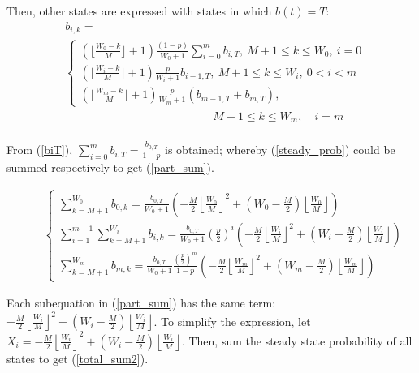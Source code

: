 \documentclass[journal]{IEEEtran}
\begin{document}
Then, other states are expressed with states in which $b(t)=T$:
\begin{align}
&b_{i,k} =  \nonumber \\
&
\begin{cases}
(\lfloor \frac{W_0-k}{M} \rfloor+1)\frac{(1-p)}{W_0+1}\sum_{i=0}^m b_{i,T}, \  M+1\leq k\leq W_0,\ i = 0\\[3pt]
(\lfloor \frac{W_i-k}{M} \rfloor+1)\frac{p}{W_i+1}b_{i-1,T}, 				\	 M+1 \leq k\leq W_i, \ 0<i<m \\[3pt]
(\lfloor \frac{W_m-k}{M} \rfloor+1)\frac{p}{W_m+1} (b_{m-1,T}+b_{m,T}), 	
\end{cases}\nonumber
\\ &\qquad \qquad \qquad \qquad \quad \qquad \qquad M+1 \leq k\leq W_m, \quad i = m \nonumber \\
\label{steady_prob}
\end{align}

From (\ref{biT}), $\sum_{i=0}^m b_{i,T}= \frac{b_{0,T}}{1-p}$ is obtained; whereby (\ref{steady_prob}) could be summed respectively to get (\ref{part_sum}).  

\begin{figure}[!t]
\begin{align}
\begin{cases}
\sum_{k=M+1}^{W_0} b_{0,k} = \frac{b_{0,T}}{W_0+1}\left(-\frac{M}{2}\left\lfloor \frac{W_0}{M}\right\rfloor ^2 + \left(W_0-\frac{M}{2}\right)\left\lfloor \frac{W_0}{M} \right\rfloor \right) \\[8pt]
\sum_{i=1}^{m-1}\sum_{k=M+1}^{W_i} b_{i,k} = \frac{b_{0,T}}{W_0+1}\left(\frac{p}{2}\right)^i \left(-\frac{M}{2}\left\lfloor \frac{W_i}{M}\right\rfloor ^2 + \left(W_i-\frac{M}{2}\right)\left\lfloor \frac{W_i}{M} \right\rfloor \right) \\[8pt]
\sum_{k=M+1}^{W_m} b_{m,k} = \frac{b_{0,T}}{W_0+1}\frac{(\frac{p}{2})^m}{1-p}\left(-\frac{M}{2}\left\lfloor \frac{W_m}{M}\right\rfloor ^2 + \left(W_m-\frac{M}{2}\right)\left\lfloor \frac{W_m}{M} \right\rfloor \right) 
\end{cases}
\label{part_sum}
\end{align}
\end{figure}

Each subequation in (\ref{part_sum}) has the same term: $-\frac{M}{2}\left\lfloor \frac{W_i}{M}\right\rfloor ^2 + \left(W_i-\frac{M}{2}\right)\left\lfloor \frac{W_i}{M} \right\rfloor$. 
To simplify the expression, let $X_i = -\frac{M}{2}\left\lfloor \frac{W_i}{M}\right\rfloor ^2 + \left(W_i-\frac{M}{2}\right)\left\lfloor \frac{W_i}{M} \right\rfloor$. 
Then, sum the steady state probability of all states to get (\ref{total_sum2}).
\end{document}
